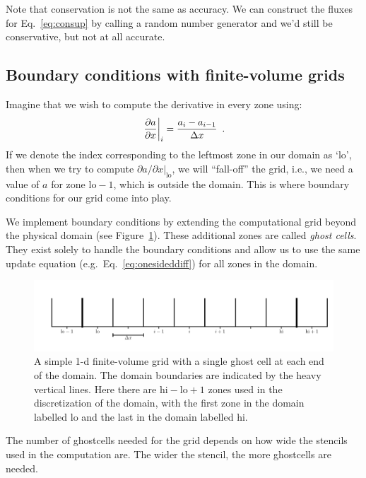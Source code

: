 Note that conservation is not the same as accuracy.  We can construct the 
fluxes for Eq.~\ref{eq:consup} by calling a random number generator and we'd
still be conservative, but not at all accurate.

\subsection{Boundary conditions with finite-volume grids}

Imagine that we wish to compute the derivative in every zone using:
\begin{equation}
\left . \frac{\partial a}{\partial x} \right |_i = \frac{a_i - a_{i-1}}{\Delta x} \enskip .
\label{eq:onesideddiff}
\end{equation}
If we denote the index corresponding to the leftmost zone in our
domain as `lo', then when we try to compute ${\partial a}/{\partial x}
|_\mathrm{lo}$, we will ``fall-off'' the grid, i.e., we need a value
of $a$ for zone $\mathrm{lo}-1$, which is outside the domain.  This is
where boundary conditions for our grid come into play.  

We implement boundary conditions by extending the computational grid
beyond the physical domain (see Figure~\ref{fig:fv_gc}).  These
additional zones are called {\em ghost cells}.  They exist solely to
handle the boundary conditions and allow us to use the same update
equation (e.g.\ Eq.~\ref{eq:onesideddiff}) for all zones in the
domain.

\begin{figure}[t]
\centering
\includegraphics[width=\linewidth]{simplegrid_gc}
\caption[A simple 1-d finite-volume grid with ghost
  cells.]{\label{fig:fv_gc} A simple 1-d finite-volume grid with a
  single ghost cell at each end of the domain.  The domain boundaries
  are indicated by the heavy vertical lines.  Here there are
  $\mathrm{hi}-\mathrm{lo}+1$ zones used in the discretization of the
  domain, with the first zone in the domain labelled $\mathrm{lo}$ and
  the last in the domain labelled $\mathrm{hi}$.}
\end{figure}

The number of ghostcells needed for the grid depends on how wide the
stencils used in the computation are.  The wider the stencil, the more
ghostcells are needed.

